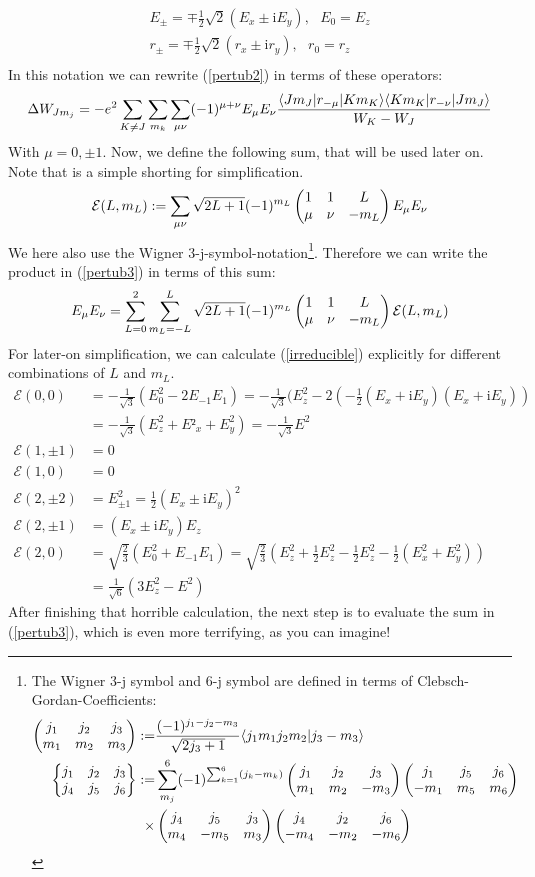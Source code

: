 \begin{align}
E_{\pm}=\mp\frac{1}{2}\sqrt{2}(E_x\pm \mathrm{i}E_y),\ \ \ E_0=E_z\\
r_{\pm}=\mp\frac{1}{2}\sqrt{2}(r_x\pm \mathrm{i}r_y),\ \ \ r_0=r_z\\
\end{align}
In this notation we can rewrite (\ref{pertub2}) in terms of these operators:
\begin{equation}
\Delta W_{Jm_j}=-e^2\sum_{K\neq J}\sum_{m_k}\sum_{\mu\nu}(-1)^{\mu+\nu}E_\mu E_\nu\frac{\langle Jm_J| r_{-\mu} | Km_K\rangle\langle Km_K| r_{-\nu} | Jm_J\rangle}{W_K-W_J}\label{pertub3}
\end{equation}
With $\mu=0,\pm1$. Now, we define the following sum, that will be used later on. Note that is a simple shorting for simplification.
\begin{equation}
\mathcal{E}(L,m_L):=\sum_{\mu\nu}\sqrt{2L+1}(-1)^{m_L}\begin{pmatrix}1&1&L\\\mu&\nu&-m_L\end{pmatrix}E_\mu E_\nu\label{irreducible}
\end{equation}
We here also use the Wigner 3-j-symbol-notation\footnote{The Wigner 3-j symbol and 6-j symbol are defined in terms of Clebsch-Gordan-Coefficients:\begin{align}\begin{pmatrix}j_1&j_2&j_3\\m_1&m_2&m_3\end{pmatrix}:=&\frac{(-1)^{j_1-j_2-m_3}}{\sqrt{2j_3+1}}\langle j_1m_1j_2m_2 | j_3-m_3 \rangle\\\begin{Bmatrix}j_1&j_2&j_3\\j_4&j_5&j_6\end{Bmatrix}:=&\sum^6_{m_j}(-1)^{\sum^6_{k=1}(j_k-m_k)}\begin{pmatrix}j_1&j_2&j_3\\m_1&m_2&-m_3\end{pmatrix}\begin{pmatrix}j_1&j_5&j_6\\-m_1&m_5&m_6\end{pmatrix}\\\times&\begin{pmatrix}j_4&j_5&j_3\\m_4&-m_5&m_3\end{pmatrix}\begin{pmatrix}j_4&j_2&j_6\\-m_4&-m_2&-m_6\end{pmatrix}\label{jsymbols}\end{align}}. Therefore we can write the product in (\ref{pertub3}) in terms of this sum: 
\begin{equation}
E_\mu E_\nu=\sum^2_{L=0}\sum^L_{m_L=-L}\sqrt{2L+1}(-1)^{m_L}\begin{pmatrix}1&1&L\\\mu&\nu&-m_L\end{pmatrix}\mathcal{E}(L,m_L)
\end{equation}
For later-on simplification, we can calculate (\ref{irreducible}) explicitly for different combinations of $L$ and $m_L$.
\begin{align*}
\mathcal{E}(0,0)&=-\frac{1}{\sqrt{3}}(E^2_0-2E_{-1}E_{1})=-\frac{1}{\sqrt{3}}(E^2_z-2(-\frac{1}{2}(E_x+\mathrm{i}E_y)(E_x+\mathrm{i}E_y))\\&=-\frac{1}{\sqrt{3}}(E^2_z+E²_x+E^2_y)=-\frac{1}{\sqrt{3}}E^2\\
\mathcal{E}(1,\pm 1)&=0\\
\mathcal{E}(1,0)&=0\\
\mathcal{E}(2,\pm2)&=E^2_{\pm1}=\frac{1}{2}(E_x\pm \mathrm{i}E_y)^2\\
\mathcal{E}(2,\pm1)&=(E_x\pm \mathrm{i}E_y)E_z\\
\mathcal{E}(2,0)&=\sqrt{\frac{2}{3}}(E^2_0+E_{-1}E_1)=\sqrt{\frac{2}{3}}(E^2_z+\frac{1}{2}E^2_z-\frac{1}{2}E^2_z-\frac{1}{2}(E^2_x+E^2_y))\\&=\frac{1}{\sqrt{6}}(3E^2_z-E^2)
\end{align*}
After finishing that horrible calculation, the next step is to evaluate the sum in (\ref{pertub3}), which is even more terrifying, as you can imagine!

